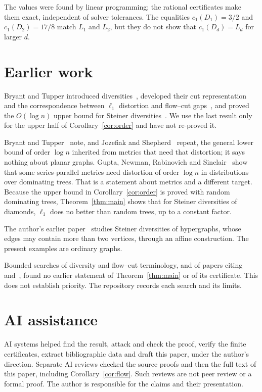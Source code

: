 \documentclass[11pt]{article}
\begin{document}
The values were found by linear programming; the rational certificates make
them exact, independent of solver tolerances. The equalities
$c_1(D_1)=3/2$ and $c_1(D_2)=17/8$ match $L_1$ and $L_2$, but they do not
show that $c_1(D_d)=L_d$ for larger $d$.

\section{Earlier work}\label{sec:earlier}
Bryant and Tupper introduced diversities~\cite{BT12}, developed their cut
representation and the correspondence between $\ell_1$ distortion and
flow--cut gaps~\cite{BT14}, and proved the $O(\log n)$ upper bound for
Steiner diversities~\cite[Theorem 2]{BTopen}. We use the last result only
for the upper half of Corollary~\ref{cor:order} and have not re-proved it.

Bryant and Tupper~\cite{BTopen} note, and Jozefiak and Shepherd~\cite{JS}
repeat, the general lower bound of order $\log n$ inherited from metrics that
need that distortion; it says nothing about planar graphs. Gupta, Newman,
Rabinovich and Sinclair~\cite{GNRS} show that some series-parallel metrics
need distortion of order $\log n$ in distributions over dominating trees.
That is a statement about metrics and a different target. Because the upper
bound in Corollary~\ref{cor:order} is proved with random dominating trees,
Theorem~\ref{thm:main} shows that for Steiner diversities of diamonds,
$\ell_1$ does no better than random trees, up to a constant factor.

The author's earlier paper~\cite{Kline} studies Steiner diversities of
hypergraphs, whose edges may contain more than two vertices, through an
affine construction. The present examples are ordinary graphs.

Bounded searches of diversity and flow--cut terminology, and of papers
citing~\cite{BT14} and~\cite{JS}, found no earlier statement of
Theorem~\ref{thm:main} or of its certificate. This does not establish
priority. The repository records each search and its limits.

\section*{AI assistance}
AI systems helped find the result, attack and check the proof, verify the
finite certificates, extract bibliographic data and draft this paper, under
the author's direction. Separate AI reviews checked the source proofs and
then the full text of this paper, including Corollary~\ref{cor:flow}. Such
reviews are not peer review or a formal proof. The author is responsible for
the claims and their presentation.
\end{document}
